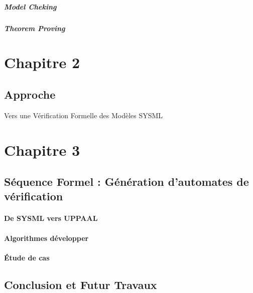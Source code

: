 \documentclass[french]{spimufcphdthesis}
\begin{document}
\subsubsection{Model Cheking}


\subsubsection{Theorem Proving}


\part{Chapitre 2}
\chapter{Approche}
Vers une Vérification Formelle des Modèles SYSML

\part{Chapitre 3}
\chapter{Séquence Formel : Génération d'automates de vérification}
\subsection{De SYSML vers UPPAAL}
\subsection{Algorithmes développer}
\subsection{Étude de cas}

\chapter{Conclusion et Futur Travaux}
\end{document}
